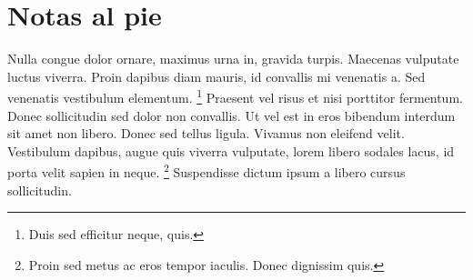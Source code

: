 \documentclass[12pt,a4paper]{article}
\begin{document}
\section{Notas al pie}

Nulla congue dolor ornare, maximus urna in, gravida turpis.
Maecenas vulputate luctus viverra. Proin dapibus diam mauris,
id convallis mi venenatis a. Sed venenatis vestibulum elementum.%
\footnote{Duis sed efficitur neque, quis.}
Praesent vel risus et nisi porttitor fermentum.
Donec sollicitudin sed dolor non convallis.
Ut vel est in eros bibendum interdum sit amet non libero.
Donec sed tellus ligula. Vivamus non eleifend velit.
Vestibulum dapibus, augue quis viverra vulputate, lorem libero sodales lacus,
id porta velit sapien in neque.%
\footnote{Proin sed metus ac eros tempor iaculis. Donec dignissim quis.}
Suspendisse dictum ipsum a libero cursus sollicitudin. 
\end{document}
